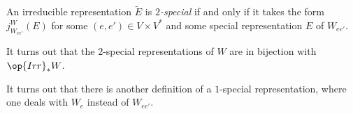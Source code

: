 \documentclass[../notes.tex]{subfiles}
\begin{document}
\begin{definition}[special]
	An irreducible representation $\widetilde E$ is \textit{$2$-special} if and only if it takes the form $j^W_{W_{ee'}}(E)$ for some $(e,e')\in V\times V^*$ and some special representation $E$ of $W_{ee'}$.
\end{definition}
It turns out that the $2$-special representations of $W$ are in bijection with $\op{Irr}_*W$.
\begin{remark}
	It turns out that there is another definition of a $1$-special representation, where one deals with $W_e$ instead of $W_{ee'}$. %
\end{remark}
\end{document}
